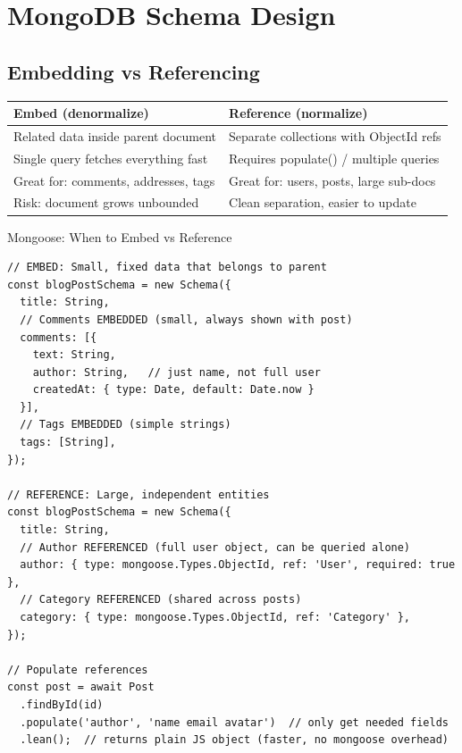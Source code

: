 \documentclass[12pt,a4paper]{article}
\begin{document}
\newpage

\section{MongoDB Schema Design}

\subsection{Embedding vs Referencing}

\begin{center}
\begin{tabularx}{\textwidth}{|X|X|}
\hline
\rowcolor{FaranDark}
\color{white}\textbf{Embed (denormalize)} & \color{white}\textbf{Reference (normalize)} \\
\hline
Related data inside parent document & Separate collections with ObjectId refs \\
\hline
\rowcolor{SectionBg}
Single query fetches everything fast & Requires populate() / multiple queries \\
\hline
Great for: comments, addresses, tags & Great for: users, posts, large sub-docs \\
\hline
\rowcolor{SectionBg}
Risk: document grows unbounded & Clean separation, easier to update \\
\hline
\end{tabularx}
\end{center}

\begin{codebox}{Mongoose: When to Embed vs Reference}
\begin{lstlisting}
// EMBED: Small, fixed data that belongs to parent
const blogPostSchema = new Schema({
  title: String,
  // Comments EMBEDDED (small, always shown with post)
  comments: [{
    text: String,
    author: String,   // just name, not full user
    createdAt: { type: Date, default: Date.now }
  }],
  // Tags EMBEDDED (simple strings)
  tags: [String],
});

// REFERENCE: Large, independent entities
const blogPostSchema = new Schema({
  title: String,
  // Author REFERENCED (full user object, can be queried alone)
  author: { type: mongoose.Types.ObjectId, ref: 'User', required: true },
  // Category REFERENCED (shared across posts)
  category: { type: mongoose.Types.ObjectId, ref: 'Category' },
});

// Populate references
const post = await Post
  .findById(id)
  .populate('author', 'name email avatar')  // only get needed fields
  .lean();  // returns plain JS object (faster, no mongoose overhead)
\end{lstlisting}
\end{codebox}
\end{document}
